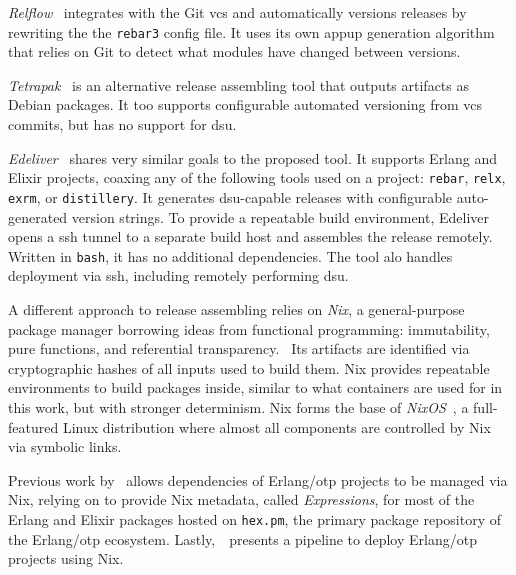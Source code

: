 \emph{Relflow}~\cite{relflow} integrates with the Git \acrshort{vcs} and automatically versions releases by rewriting the the \lstinline|rebar3| config file. It uses its own \acrshort{appup} generation algorithm that relies on Git to detect what modules have changed between versions.

\emph{Tetrapak}~\cite{tetrapak} is an alternative release assembling tool that outputs artifacts as Debian packages. It too supports configurable automated versioning from \acrshort{vcs} commits, but has no support for \acrshort{dsu}.

\emph{Edeliver}~\cite{edeliver,talk:edeliver} shares very similar goals to the proposed tool. It supports Erlang and Elixir projects, coaxing any of the following tools used on a project: \lstinline|rebar|, \lstinline|relx|, \lstinline|exrm|, or \lstinline|distillery|. It generates \acrshort{dsu}-capable releases with configurable auto-generated version strings. To provide a repeatable build environment, Edeliver opens a \acrfull{ssh} tunnel to a separate build host and assembles the release remotely. Written in \lstinline|bash|, it has no additional dependencies. The tool alo handles deployment via \acrshort{ssh}, including remotely performing \acrshort{dsu}.

A different approach to release assembling relies on \emph{Nix}, a general-purpose package manager borrowing ideas from functional programming: immutability, pure functions, and referential transparency.~\cite{nix1} Its artifacts are identified via cryptographic hashes of all inputs used to build them. Nix provides repeatable environments to build packages inside, similar to what containers are used for in this work, but with stronger determinism. Nix forms the base of \emph{NixOS}~\cite{nixos}, a full-featured Linux distribution where almost all components are controlled by Nix via symbolic links.

Previous work by~\cite{erlangnix} allows dependencies of Erlang/\acrshort{otp} projects to be managed via Nix, relying on \cite{hex2nix} to provide Nix metadata, called \emph{Expressions}, for most of the Erlang and Elixir packages hosted on \lstinline|hex.pm|, the primary package repository of the Erlang/\acrshort{otp} ecosystem. Lastly,~\cite{erlangnix2}~presents a pipeline to deploy Erlang/\acrshort{otp} projects using Nix.
